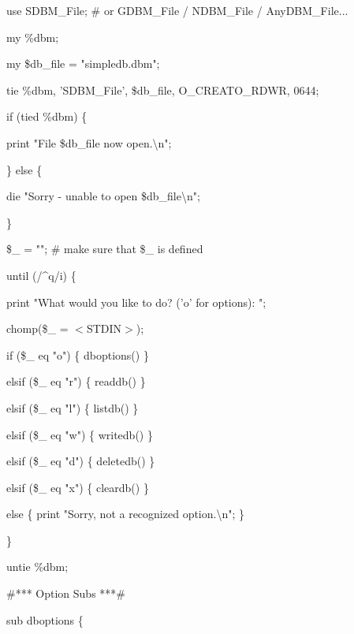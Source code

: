 \documentclass[a4paper,11pt]{book}
\begin{document}
\noindent use SDBM\_File; \# or GDBM\_File / NDBM\_File / AnyDBM\_File...

\noindent 

\noindent 

\noindent my \%dbm;

\noindent my \$db\_file = "simpledb.dbm";

\noindent 

\noindent tie \%dbm, 'SDBM\_File', \$db\_file, O\_CREAT\textbar O\_RDWR, 0644;

\noindent 

\noindent if (tied \%dbm) \{

\noindent print "File \$db\_file now open.\textbackslash n";

\noindent \} else \{

\noindent die "Sorry - unable to open \$db\_file\textbackslash n";

\noindent \}

\noindent 

\noindent \$\_  = ""; \# make sure that \$\_  is defined

\noindent 

\noindent until (/\^{}q/i) \{

\noindent 

\noindent print "What would you like to do? ('o' for options): ";

\noindent chomp(\$\_  = $<$STDIN$>$);

\noindent 

\noindent if (\$\_  eq "o") \{ dboptions() \}

\noindent elsif (\$\_  eq "r") \{ readdb() \}

\noindent elsif (\$\_  eq "l") \{ listdb() \}

\noindent elsif (\$\_  eq "w") \{ writedb() \}

\noindent elsif (\$\_  eq "d") \{ deletedb() \}

\noindent elsif (\$\_  eq "x") \{ cleardb() \}

\noindent else \{ print "Sorry, not a recognized option.\textbackslash n"; \}

\noindent \}

\noindent 

\noindent untie \%dbm;

\noindent 

\noindent \#*** Option Subs ***\#

\noindent 

\noindent sub dboptions \{
\end{document}
